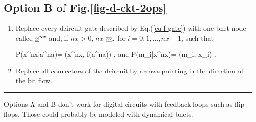 \subsection{Option B of Fig.\ref{fig-d-ckt-2ops}}
\begin{enumerate}
\item
Replace every dcircuit  gate 
described by Eq.(\ref{eq-f-gate})
with
one bnet node called $\rvx^{nx}$
and, if $nx>0$, 
$nx$  $\rvm_i$
for $i=0, 1, \ldots, nx-1$, such that

\beq\color{blue}
P(x^{nx}|a^{na})=
\delta(x^{nx}, f(a^{na}))
\;,
\eeq
and
\beq\color{blue}
P(m_i|x^{nx})=
\delta(m_i, x_i)
\;.
\eeq


\item
Replace
all connectors of the dcircuit
by arrows 
pointing in the direction
of the bit flow.



\end{enumerate}
\hrule 
Options A and B don't work
for digital circuits 
with feedback loops 
such as flip-flops.
Those could probably
be modeled with 
dynamical bnets.